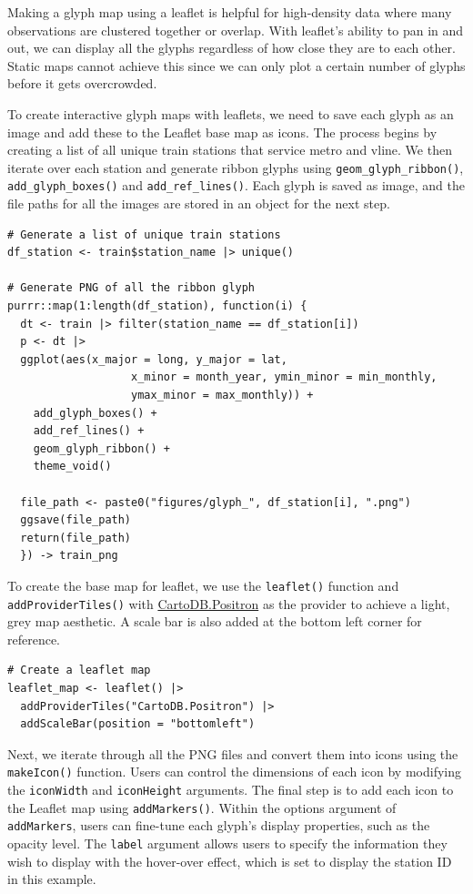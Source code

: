 Making a glyph map using a leaflet is helpful for high-density data where many observations are clustered together or overlap. With leaflet's ability to pan in and out, we can display all the glyphs regardless of how close they are to each other. Static maps cannot achieve this since we can only plot a certain number of glyphs before it gets overcrowded.

To create interactive glyph maps with leaflets, we need to save each glyph as an image and add these to the Leaflet base map as icons. The process begins by creating a list of all unique train stations that service metro and vline. We then iterate over each station and generate ribbon glyphs using \texttt{geom\_glyph\_ribbon()}, \texttt{add\_glyph\_boxes()} and \texttt{add\_ref\_lines()}. Each glyph is saved as image, and the file paths for all the images are stored in an object for the next step.

\begin{verbatim}
# Generate a list of unique train stations
df_station <- train$station_name |> unique()

# Generate PNG of all the ribbon glyph
purrr::map(1:length(df_station), function(i) {
  dt <- train |> filter(station_name == df_station[i])
  p <- dt |>
  ggplot(aes(x_major = long, y_major = lat,
                   x_minor = month_year, ymin_minor = min_monthly,
                   ymax_minor = max_monthly)) +
    add_glyph_boxes() +
    add_ref_lines() +
    geom_glyph_ribbon() +
    theme_void() 
  
  file_path <- paste0("figures/glyph_", df_station[i], ".png")
  ggsave(file_path)
  return(file_path)
  }) -> train_png 
\end{verbatim}

To create the base map for leaflet, we use the \texttt{leaflet()} function and \texttt{addProviderTiles()} with \href{https://github.com/CartoDB/basemap-styles}{CartoDB.Positron} as the provider to achieve a light, grey map aesthetic. A scale bar is also added at the bottom left corner for reference.

\begin{verbatim}
# Create a leaflet map 
leaflet_map <- leaflet() |>
  addProviderTiles("CartoDB.Positron") |>
  addScaleBar(position = "bottomleft")
\end{verbatim}

Next, we iterate through all the PNG files and convert them into icons using the \texttt{makeIcon()} function. Users can control the dimensions of each icon by modifying the \texttt{iconWidth} and \texttt{iconHeight} arguments. The final step is to add each icon to the Leaflet map using \texttt{addMarkers()}. Within the options argument of \texttt{addMarkers}, users can fine-tune each glyph's display properties, such as the opacity level. The \texttt{label} argument allows users to specify the information they wish to display with the hover-over effect, which is set to display the station ID in this example.

